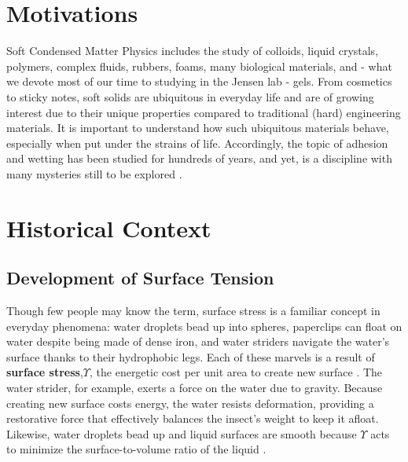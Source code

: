 

\section{Motivations}
Soft Condensed Matter Physics includes the study of colloids, liquid crystals, polymers, complex fluids, rubbers, foams, many biological materials, and - what we devote most of our time to studying in the Jensen lab - gels. From cosmetics to sticky notes, soft solids are ubiquitous in everyday life and are of growing interest due to their unique properties compared to traditional (hard) engineering materials.  It is important to understand how such ubiquitous materials behave, especially when put under the strains of life. Accordingly, the topic of adhesion and wetting has been studied for hundreds of years, and yet, is a discipline with many mysteries still to be explored  \cite{GennesPierre-Gillesde2003Cawp}. 

 
\section{Historical Context}
\subsection{Development of Surface Tension}
Though few people may know the term, surface stress is a familiar concept in everyday phenomena: water droplets bead up into spheres, paperclips can float on water despite being made of dense iron, and water striders navigate the water's surface thanks to their hydrophobic legs. Each of these marvels is a result of \textbf{surface stress},$\Upsilon$, the  energetic cost per unit area to create new surface \cite{cammarata1994surface}. The water strider, for example, exerts a force on the water due to gravity. Because creating new surface costs energy, the water resists deformation, providing a restorative force that effectively balances the insect’s weight to keep it afloat. Likewise, water droplets bead up and liquid surfaces are smooth because $\Upsilon$ acts to minimize the surface-to-volume ratio of the liquid \cite{gibbs1906scientific,GennesPierre-Gillesde2003Cawp}. 

